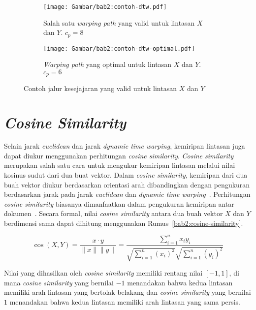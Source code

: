 \begin{figure}[h]
    \centering
    \begin{subfigure}{0.185\textwidth}
        \centering
        \texttt{[image: Gambar/bab2:contoh-dtw.pdf]}
        \caption{Salah satu \textit{warping path} yang valid untuk lintasan $X$ dan $Y$. $c_p = 8$}
        \label{bab2:warping-path}
    \end{subfigure} \hspace{1cm}
    \begin{subfigure}{0.185\textwidth}
        \centering
        \texttt{[image: Gambar/bab2:contoh-dtw-optimal.pdf]}
        \caption{\textit{Warping path} yang optimal untuk lintasan $X$ dan $Y$. $c_p = 6$}
        \label{bab2:warping-path-optimal}
    \end{subfigure}
    \caption{Contoh jalur kesejajaran yang valid untuk lintasan $X$ dan $Y$}
    \label{bab2:contoh-dtw}
\end{figure}

\section{\textit{Cosine Similarity}}

Selain jarak \textit{euclidean} dan jarak \textit{dynamic time warping}, kemiripan lintasan juga dapat diukur menggunakan perhitungan \textit{cosine similarity}. \textit{Cosine similarity} merupakan salah satu cara untuk mengukur kemiripan lintasan melalui nilai kosinus sudut dari dua buat vektor. Dalam \textit{cosine similarity}, kemiripan dari dua buah vektor diukur berdasarkan orientasi arah dibandingkan dengan pengukuran berdasarkan jarak pada jarak \textit{euclidean} dan \textit{dynamic time warping}~\cite{sitikhu:cosine-similarity}. Perhitungan \textit{cosine similarity} biasanya dimanfaatkan dalam pengukuran kemiripan antar dokumen~\cite{sitikhu:cosine-similarity}. Secara formal, nilai \textit{cosine similarity} antara dua buah vektor $X$ dan $Y$ berdimensi sama dapat dihitung menggunakan Rumus~\ref{bab2:cosine-similarity}.

\begin{equation}
    \cos (X, Y)= \frac{x \cdot y}{\|x\| \|y\|} = \frac{ \sum_{i=1}^{n}{x_i y_i}}{ \sqrt{\sum_{i=1}^{n}{(x_i)^2}} \sqrt{\sum_{i=1}^{n}{( y_i)^2}} }
    \label{bab2:cosine-similarity}
\end{equation}

Nilai yang dihasilkan oleh \textit{cosine similarity} memiliki rentang nilai $[-1, 1]$, di mana \textit{cosine similarity} yang bernilai $-1$ menandakan bahwa kedua lintasan memiliki arah lintasan yang bertolak belakang dan \textit{cosine similarity} yang bernilai $1$ menandakan bahwa kedua lintasan memiliki arah lintasan yang sama persis.

